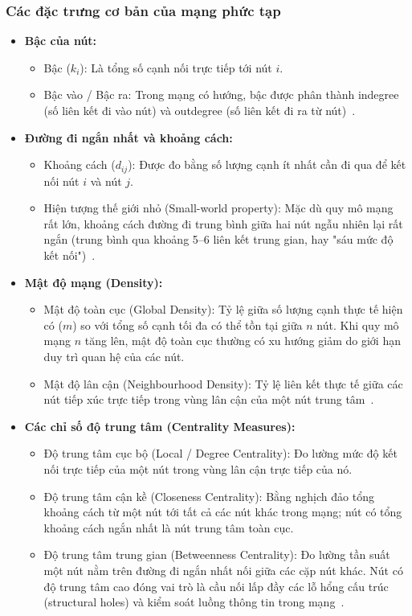 \documentclass[14pt,a4paper]{extarticle}
\begin{document}
\subsubsection{Các đặc trưng cơ bản của mạng phức tạp}

\begin{itemize}
    \item \textbf{Bậc của nút:}
    \begin{itemize}
        \item Bậc ($k_i$): Là tổng số cạnh nối trực tiếp tới nút $i$.
        \item Bậc vào / Bậc ra: Trong mạng có hướng, bậc được phân thành indegree (số liên kết đi vào nút) và outdegree (số liên kết đi ra từ nút)~\cite{Scott2012}.
    \end{itemize}

    \item \textbf{Đường đi ngắn nhất và khoảng cách:}
    \begin{itemize}
        \item Khoảng cách ($d_{ij}$): Được đo bằng số lượng cạnh ít nhất cần đi qua để kết nối nút $i$ và nút $j$.
        \item Hiện tượng thế giới nhỏ (Small-world property): Mặc dù quy mô mạng rất lớn, khoảng cách đường đi trung bình giữa hai nút ngẫu nhiên lại rất ngắn (trung bình qua khoảng 5--6 liên kết trung gian, hay "sáu mức độ kết nối")~\cite{Scott2012}.
    \end{itemize}

    \item \textbf{Mật độ mạng (Density):}
    \begin{itemize}
        \item Mật độ toàn cục (Global Density): Tỷ lệ giữa số lượng cạnh thực tế hiện có ($m$) so với tổng số cạnh tối đa có thể tồn tại giữa $n$ nút. Khi quy mô mạng $n$ tăng lên, mật độ toàn cục thường có xu hướng giảm do giới hạn duy trì quan hệ của các nút.
        \item Mật độ lân cận (Neighbourhood Density): Tỷ lệ liên kết thực tế giữa các nút tiếp xúc trực tiếp trong vùng lân cận của một nút trung tâm~\cite{Scott2012}.
    \end{itemize}

    \item \textbf{Các chỉ số độ trung tâm (Centrality Measures):}
    \begin{itemize}
        \item Độ trung tâm cục bộ (Local / Degree Centrality): Đo lường mức độ kết nối trực tiếp của một nút trong vùng lân cận trực tiếp của nó.
        \item Độ trung tâm cận kề (Closeness Centrality): Bằng nghịch đảo tổng khoảng cách từ một nút tới tất cả các nút khác trong mạng; nút có tổng khoảng cách ngắn nhất là nút trung tâm toàn cục.
        \item Độ trung tâm trung gian (Betweenness Centrality): Đo lường tần suất một nút nằm trên đường đi ngắn nhất nối giữa các cặp nút khác. Nút có độ trung tâm cao đóng vai trò là cầu nối lấp đầy các lỗ hổng cấu trúc (structural holes) và kiểm soát luồng thông tin trong mạng~\cite{Scott2012}.
    \end{itemize}


\end{itemize}
\end{document}
